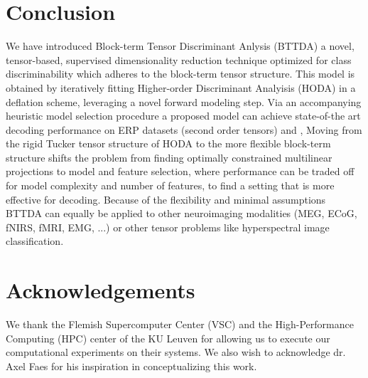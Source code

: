 \documentclass[twocolumn]{article}
\begin{document}
\section{Conclusion}
We have introduced Block-term Tensor Discriminant Anlysis (BTTDA) a novel,
tensor-based, supervised dimensionality reduction technique optimized for class
discriminability which adheres to the block-term tensor structure.
This model is obtained by iteratively fitting Higher-order Discriminant
Analyisis (HODA) in a deflation scheme, leveraging a novel forward modeling step.
Via an accompanying heuristic model selection procedure a proposed model can
achieve state-of-the art decoding performance on ERP datasets
(second order tensors) and ,
Moving from the rigid Tucker tensor structure of HODA to the more flexible
block-term structure shifts the problem from finding optimally constrained multilinear
projections to model and feature selection, where performance can be traded
off for model complexity and number of features, to find a setting that is more
effective for decoding.
Because of the flexibility and minimal assumptions BTTDA
can equally be applied to other neuroimaging modalities (MEG, ECoG, fNIRS,
fMRI, EMG, ...) or
other tensor problems like hyperspectral image classification.

\section*{Acknowledgements}
We thank the Flemish Supercomputer Center (VSC) and the High-Performance
Computing (HPC) center of the KU Leuven for allowing us to execute our
computational experiments on their systems.
We also wish to acknowledge dr. Axel Faes for his inspiration in conceptualizing this
work.

\printbibliography
\end{document}
